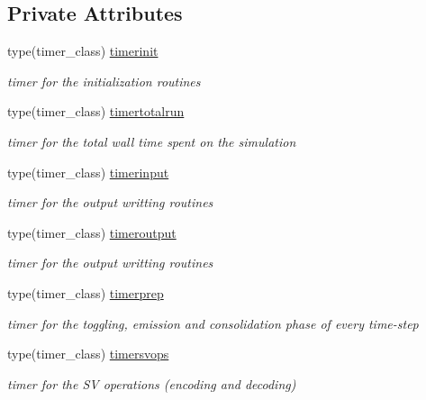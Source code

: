 \subsection*{Private Attributes}
\begin{DoxyCompactItemize}
\item 
type(timer\+\_\+class) \mbox{\hyperlink{structsimulation__mod_1_1simulation__class_ae5fe25a2db3a3e3c6896c13af90edb1c}{timerinit}}
\begin{DoxyCompactList}\small\item\em timer for the initialization routines \end{DoxyCompactList}\item 
type(timer\+\_\+class) \mbox{\hyperlink{structsimulation__mod_1_1simulation__class_aff028c1a3b421c73038e43b860f45de1}{timertotalrun}}
\begin{DoxyCompactList}\small\item\em timer for the total wall time spent on the simulation \end{DoxyCompactList}\item 
type(timer\+\_\+class) \mbox{\hyperlink{structsimulation__mod_1_1simulation__class_a05c525021082f10b6d452d9cf588c251}{timerinput}}
\begin{DoxyCompactList}\small\item\em timer for the output writting routines \end{DoxyCompactList}\item 
type(timer\+\_\+class) \mbox{\hyperlink{structsimulation__mod_1_1simulation__class_a8273da2899310646a161fedc96434bf9}{timeroutput}}
\begin{DoxyCompactList}\small\item\em timer for the output writting routines \end{DoxyCompactList}\item 
type(timer\+\_\+class) \mbox{\hyperlink{structsimulation__mod_1_1simulation__class_ac759ee5fda4ddfb16deeb833c59709e3}{timerprep}}
\begin{DoxyCompactList}\small\item\em timer for the toggling, emission and consolidation phase of every time-\/step \end{DoxyCompactList}\item 
type(timer\+\_\+class) \mbox{\hyperlink{structsimulation__mod_1_1simulation__class_ad43e06086299c6f9b4d37c90f81bca6c}{timersvops}}
\begin{DoxyCompactList}\small\item\em timer for the SV operations (encoding and decoding) \end{DoxyCompactList}\item 

\end{DoxyCompactItemize}
